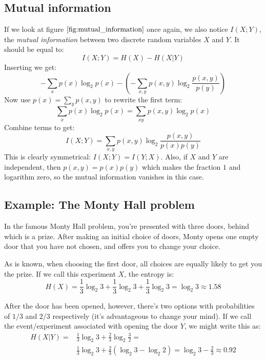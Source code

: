 \documentclass[12pt, a4paper]{article}
\numberwithin{equation}{section}
\begin{document}
\subsection{Mutual information}
If we look at figure $\ref{fig:mutual_information}$ once again, we also notice $I(X;Y)$, the \textit{mutual information} between two discrete random variables $X$ and $Y$. It should be equal to:
\begin{equation}
I(X;Y)=H(X)-H(X|Y)
\end{equation}
Inserting we get:
\begin{equation}
-\sum_x p(x)\log_2 p(x)-\left(-\sum_{x,y}p(x,y)\log_2\frac{p(x,y)}{p(y)}\right)
\end{equation}
Now use $p(x)=\sum_y p(x,y)$ to rewrite the first term:
\begin{equation}
\sum_x p(x)\log_2 p(x)=\sum_{xy}p(x,y)\log_2 p(x)
\end{equation}
Combine terms to get:
\begin{equation}
I(X;Y)=\sum_{x,y}p(x,y)\log_2\frac{p(x,y)}{p(x)p(y)}
\end{equation}
This is clearly symmetrical: $I(X;Y)=I(Y;X)$. Also, if $X$ and $Y$ are independent, then $p(x,y)=p(x)p(y)$ which makes the fraction $1$ and logarithm zero, so the mutual information vanishes in this case.

\subsection{Example: The Monty Hall problem}
In the famous Monty Hall problem, you're presented with three doors, behind which is a prize. After making an initial choice of doors, Monty opens one empty door that you have not chosen, and offers you to change your choice.

As is known, when choosing the first door, all choices are equally likely to get you the prize. If we call this experiment $X$, the entropy is:
\begin{equation}
H(X)=\frac{1}{3}\log_2 3+\frac{1}{3}\log_2 3+\frac{1}{3}\log_2 3=\log_2 3\approx 1.58
\end{equation}

After the door has been opened, however, there's two options with probabilities of $1/3$ and $2/3$ respectively (it's advantageous to change your mind). If we call the event/experiment associated with opening the door $Y$, we might write this as:
\begin{align}
H(X|Y)=&\frac{1}{3}\log_2 3+\frac{2}{3}\log_2\frac{3}{2}=\\
&\frac{1}{3}\log_2 3+\frac{2}{3}(\log_2 3-\log_2 2)=\log_2 3-\frac{2}{3}\approx 0.92
\end{align}
\end{document}
